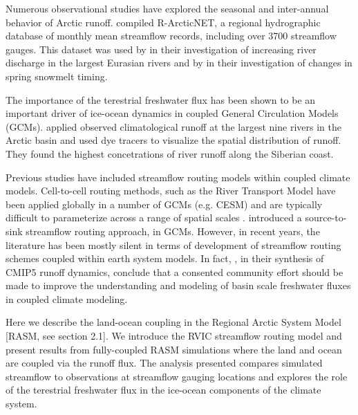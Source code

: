 \documentclass[ms, draft]{agutex}
\begin{document}
\begin{article}
Numerous observational studies have explored the seasonal and inter-annual behavior of Arctic runoff.
\citet{Lammers_2001} compiled R-ArcticNET, a regional hydrographic database of monthly mean streamflow records, including over 3700 streamflow gauges.
This dataset was used by \citet{Shiklomanov_2009} in their investigation of increasing river discharge in the largest Eurasian rivers and by \citep{Tan_2011} in their investigation of changes in spring snowmelt timing.



The importance of the terestrial freshwater flux has been shown to be an important driver of ice-ocean dynamics in coupled General Circulation Models (GCMs).
\citet{Newton_2008} applied observed climatological runoff at the largest nine rivers in the Arctic basin and used dye tracers to visualize the spatial distribution of runoff.
They found the highest concetrations of river runoff along the Siberian coast.

Previous studies have included streamflow routing models within coupled climate models.
Cell-to-cell routing methods, such as the River Transport Model \citep[RTM][]{Branstetter_2003} have been applied globally in a number of GCMs (e.g. CESM) and are typically difficult to parameterize across a range of spatial scales \citep{Sushama_2004}.
\citep{Olivera_2000} introduced a source-to-sink streamflow routing approach, in GCMs.
However, in recent years, the literature has been mostly silent in terms of development of streamflow routing schemes coupled within earth system models.
In fact, \citet{Bring_2015}, in their synthesis of CMIP5 runoff dynamics, conclude that a consented community effort should be made to improve the understanding and modeling of basin scale freshwater fluxes in coupled climate modeling.

Here we describe the land-ocean coupling in the Regional Arctic System Model [RASM, see section 2.1].
We introduce the RVIC streamflow routing model and present results from fully-coupled RASM simulations where the land and ocean are coupled via the runoff flux.
The analysis presented compares simulated streamflow to observations at streamflow gauging locations and explores the role of the terestrial freshwater flux in the ice-ocean components of the climate system.


\end{article}
\end{document}
